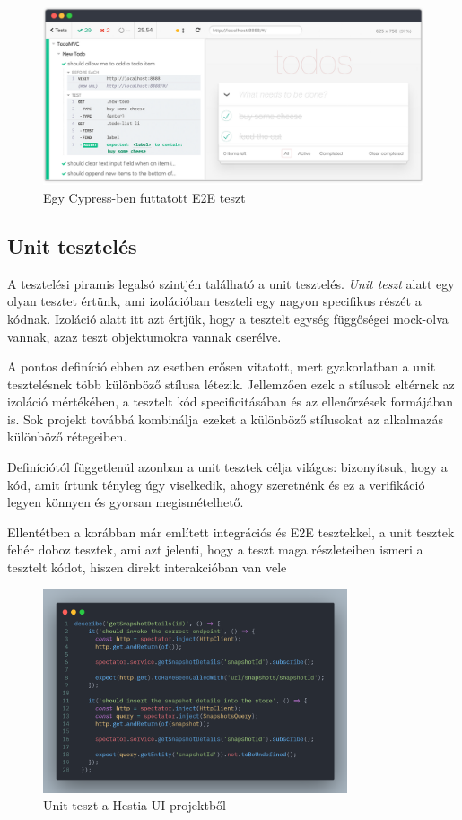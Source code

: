 \begin{figure}[H]
    \centering
    \includegraphics[width=1\textwidth]{images/cypress.png}
    \caption{Egy Cypress-ben futtatott E2E teszt}
    \label{fig:cypress-example}
\end{figure}

\subsection{Unit tesztelés}

A tesztelési piramis legalsó szintjén található a unit tesztelés. \textit{Unit teszt} alatt egy olyan tesztet értünk, ami izolációban teszteli egy nagyon specifikus részét a kódnak. Izoláció alatt itt azt értjük, hogy a tesztelt egység függőségei mock-olva vannak, azaz teszt objektumokra vannak cserélve.

A pontos definíció ebben az esetben erősen vitatott, mert gyakorlatban a unit tesztelésnek több különböző stílusa létezik. Jellemzően ezek a stílusok eltérnek az izoláció mértékében, a tesztelt kód specificitásában és az ellenőrzések formájában is. Sok projekt továbbá kombinálja ezeket a különböző stílusokat az alkalmazás különböző rétegeiben.

Definíciótól függetlenül azonban a unit tesztek célja világos: bizonyítsuk, hogy a kód, amit írtunk tényleg úgy viselkedik, ahogy szeretnénk és ez a verifikáció legyen könnyen és gyorsan megismételhető.

Ellentétben a korábban már említett integrációs és E2E tesztekkel, a unit tesztek fehér doboz tesztek, ami azt jelenti, hogy a teszt maga részleteiben ismeri a tesztelt kódot, hiszen direkt interakcióban van vele

\begin{figure}[H]
    \centering
    \includegraphics[width=0.8\textwidth]{images/unit-test.png}
    \caption{Unit teszt a Hestia UI projektből}
    \label{fig:unit-test-example}
\end{figure}

